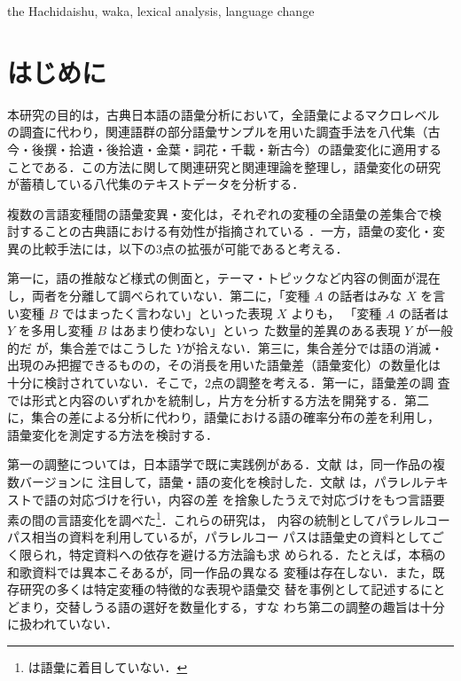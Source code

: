 \documentclass[submit]{ipsj}
\begin{document}
\begin{ekeyword}
the Hachidaishu, waka, lexical analysis, language change
\end{ekeyword}

\maketitle
\section{はじめに\label{org21288e8}}
\label{sec:org46e7800}
本研究の目的は，古典日本語の語彙分析において，全語彙によるマクロレベル
の調査に代わり，関連語群の部分語彙サンプルを用いた調査手法を八代集（古
今・後撰・拾遺・後拾遺・金葉・詞花・千載・新古今）の語彙変化に適用する
ことである．この方法に関して関連研究と関連理論を整理し，語彙変化の研究
が蓄積している八代集のテキストデータを分析する．

複数の言語変種間の語彙変異・変化は，それぞれの変種の全語彙の差集合で検
討することの古典語における有効性が指摘されている
\cite{kondo2011Heian,tsukishima1992Kunten}．一方，語彙の変化・変
異の比較手法には，以下の3点の拡張が可能であると考える．

第一に，語の推敲など様式の側面と，テーマ・トピックなど内容の側面が混在
し，両者を分離して調べられていない．第二に，「変種 \(A\) の話者はみな
\(X\) を言い変種 \(B\) ではまったく言わない」といった表現 \(X\) よりも，
「変種 \(A\) の話者は \(Y\) を多用し変種 \(B\) はあまり使わない」といっ
た数量的差異のある表現 \(Y\) が一般的だ \cite{Wolfram2004Social}
が，集合差ではこうした \(Y\)が拾えない．第三に，集合差分では語の消滅・
出現のみ把握できるものの，その消長を用いた語彙差（語彙変化）の数量化は
十分に検討されていない．そこで，2点の調整を考える．第一に，語彙差の調
査では形式と内容のいずれかを統制し，片方を分析する方法を開発する．第二
に，集合の差による分析に代わり，語彙における語の確率分布の差を利用し，
語彙変化を測定する方法を検討する．

第一の調整については，日本語学で既に実践例がある．文献 \cite{miyazima1979Kyosanto,hasumi1991Ichi} は，同一作品の複数バージョンに
注目して，語彙・語の変化を検討した．文献 \cite{kitasaki2024Heike,tanaka2014Konjaku} は，パラレルテキストで語の対応づけを行い，内容の差
を捨象したうえで対応づけをもつ言語要素の間の言語変化を調べた\footnote{\cite{kitasaki2024Heike} は語彙に着目していない．}．これらの研究は，
内容の統制としてパラレルコーパス相当の資料を利用しているが，パラレルコー
パスは語彙史の資料としてごく限られ，特定資料への依存を避ける方法論も求
められる．たとえば，本稿の和歌資料では異本こそあるが，同一作品の異なる
変種は存在しない．また，既存研究の多くは特定変種の特徴的な表現や語彙交
替を事例として記述するにとどまり，交替しうる語の選好を数量化する，すな
わち第二の調整の趣旨は十分に扱われていない．
\end{document}
